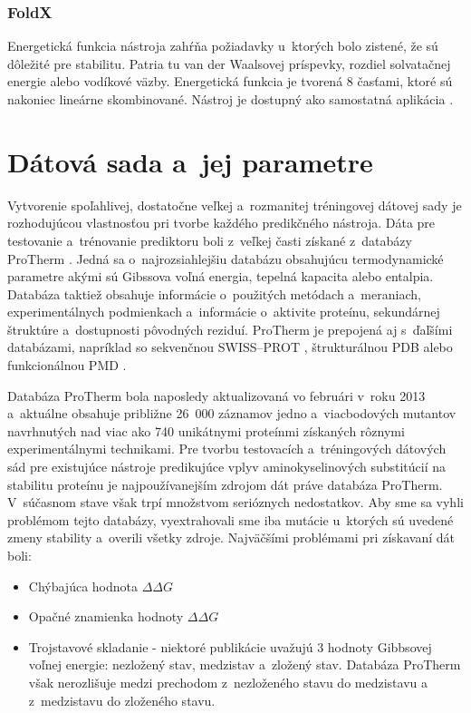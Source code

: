 \subsection{FoldX}

Energetická funkcia nástroja zahŕňa požiadavky u~ktorých bolo zistené, že sú dôležité pre stabilitu. Patria tu van der Waalsovej príspevky, rozdiel solvatačnej energie alebo vodíkové väzby. Energetická funkcia je tvorená 8 časťami, ktoré sú nakoniec lineárne skombinované. Nástroj je dostupný ako samostatná aplikácia \cite{foldx}.


\chapter{Dátová sada a~jej parametre}

Vytvorenie spoľahlivej, dostatočne veľkej a~rozmanitej tréningovej dátovej sady je rozhodujúcou vlastnosťou pri tvorbe každého predikčného nástroja. Dáta pre testovanie a~trénovanie prediktoru boli z~veľkej časti získané z~databázy ProTherm \cite{protherm}. Jedná sa o~najrozsiahlejšiu databázu obsahujúcu termodynamické parametre akými sú Gibssova voľná energia, tepelná kapacita alebo entalpia. Databáza taktiež obsahuje informácie o~použitých metódach a~meraniach, experimentálnych podmienkach a~informácie o~aktivite proteínu, sekundárnej štruktúre a~dostupnosti pôvodných reziduí. ProTherm je prepojená aj s~ďaľšími databázami, napríklad so sekvenčnou SWISS--PROT \cite{swissprot}, štrukturálnou PDB \cite{pdb} alebo funkcionálnou PMD \cite{pmd}.


Databáza ProTherm bola naposledy aktualizovaná vo februári v~roku 2013 a~aktuálne obsahuje približne 26 000 záznamov jedno a~viacbodových mutantov navrhnutých nad viac ako 740 unikátnymi proteínmi získaných rôznymi experimentálnymi technikami. Pre tvorbu testovacích a~tréningových dátových sád pre existujúce nástroje predikujúce vplyv aminokyselinových substitúcií na stabilitu proteínu je najpoužívanejším zdrojom dát práve databáza ProTherm. V~súčasnom stave však trpí množstvom serióznych nedostatkov. Aby sme sa vyhli problémom tejto databázy, vyextrahovali sme iba mutácie u~ktorých sú uvedené zmeny stability a~overili všetky zdroje. Najväčšími problémami pri získavaní dát boli:
\begin{itemize}
	\item Chýbajúca hodnota $\Delta\Delta G$
	\item Opačné znamienka hodnoty $\Delta\Delta G$ 
	\item Trojstavové skladanie - niektoré publikácie uvažujú 3 hodnoty Gibbsovej voľnej energie: nezložený stav, medzistav a~zložený stav. Databáza ProTherm však nerozlišuje medzi prechodom z~nezloženého stavu do medzistavu a z~medzistavu do zloženého stavu.
\end{itemize}

